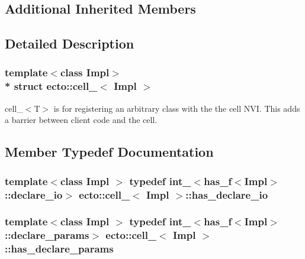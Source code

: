 \subsection*{Additional Inherited Members}


\subsection{Detailed Description}
\subsubsection*{template$<$class Impl$>$\\*
struct ecto\+::cell\+\_\+$<$ Impl $>$}

cell\+\_\+$<$\+T$>$ is for registering an arbitrary class with the the cell N\+VI. This adds a barrier between client code and the cell. 

\subsection{Member Typedef Documentation}
\subsubsection[{\texorpdfstring{has\+\_\+declare\+\_\+io}{has_declare_io}}]{\setlength{\rightskip}{0pt plus 5cm}template$<$class Impl $>$ typedef {\bf int\+\_\+}$<${\bf has\+\_\+f}$<$Impl$>$\+::{\bf declare\+\_\+io}$>$ {\bf ecto\+::cell\+\_\+}$<$ Impl $>$\+::{\bf has\+\_\+declare\+\_\+io}}\hypertarget{structecto_1_1cell___a10ab0d3f85e194d548beb3251416a569}{}\label{structecto_1_1cell___a10ab0d3f85e194d548beb3251416a569}
\subsubsection[{\texorpdfstring{has\+\_\+declare\+\_\+params}{has_declare_params}}]{\setlength{\rightskip}{0pt plus 5cm}template$<$class Impl $>$ typedef {\bf int\+\_\+}$<${\bf has\+\_\+f}$<$Impl$>$\+::{\bf declare\+\_\+params}$>$ {\bf ecto\+::cell\+\_\+}$<$ Impl $>$\+::{\bf has\+\_\+declare\+\_\+params}}\hypertarget{structecto_1_1cell___ab7b111eb2672ae4eaacc668852b8b89f}{}\label{structecto_1_1cell___ab7b111eb2672ae4eaacc668852b8b89f}

